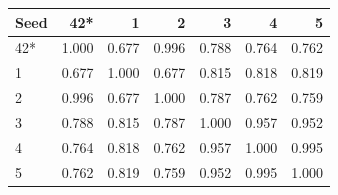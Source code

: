 \begin{tabular}{@{}lrrrrrr@{}}
\toprule
Seed & 42* & 1 & 2 & 3 & 4 & 5 \\
\midrule
42* & 1.000 & 0.677 & 0.996 & 0.788 & 0.764 & 0.762 \\
1 & 0.677 & 1.000 & 0.677 & 0.815 & 0.818 & 0.819 \\
2 & 0.996 & 0.677 & 1.000 & 0.787 & 0.762 & 0.759 \\
3 & 0.788 & 0.815 & 0.787 & 1.000 & 0.957 & 0.952 \\
4 & 0.764 & 0.818 & 0.762 & 0.957 & 1.000 & 0.995 \\
5 & 0.762 & 0.819 & 0.759 & 0.952 & 0.995 & 1.000 \\
\bottomrule
\end{tabular}
